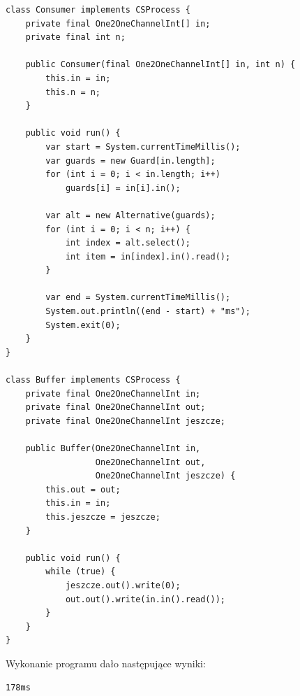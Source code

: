 \documentclass[12pt]{article}
\begin{document}
\begin{verbatim}
class Consumer implements CSProcess {
    private final One2OneChannelInt[] in;
    private final int n;

    public Consumer(final One2OneChannelInt[] in, int n) {
        this.in = in;
        this.n = n;
    }

    public void run() {
        var start = System.currentTimeMillis();
        var guards = new Guard[in.length];
        for (int i = 0; i < in.length; i++)
            guards[i] = in[i].in();

        var alt = new Alternative(guards);
        for (int i = 0; i < n; i++) {
            int index = alt.select();
            int item = in[index].in().read();
        }

        var end = System.currentTimeMillis();
        System.out.println((end - start) + "ms");
        System.exit(0);
    }
}

class Buffer implements CSProcess {
    private final One2OneChannelInt in;
    private final One2OneChannelInt out;
    private final One2OneChannelInt jeszcze;

    public Buffer(One2OneChannelInt in,
                  One2OneChannelInt out,
                  One2OneChannelInt jeszcze) {
        this.out = out;
        this.in = in;
        this.jeszcze = jeszcze;
    }

    public void run() {
        while (true) {
            jeszcze.out().write(0);
            out.out().write(in.in().read());
        }
    }
}
\end{verbatim}
\noindent
Wykonanie programu dało następujące wyniki:
\begin{verbatim}
178ms
\end{verbatim}
\end{document}
